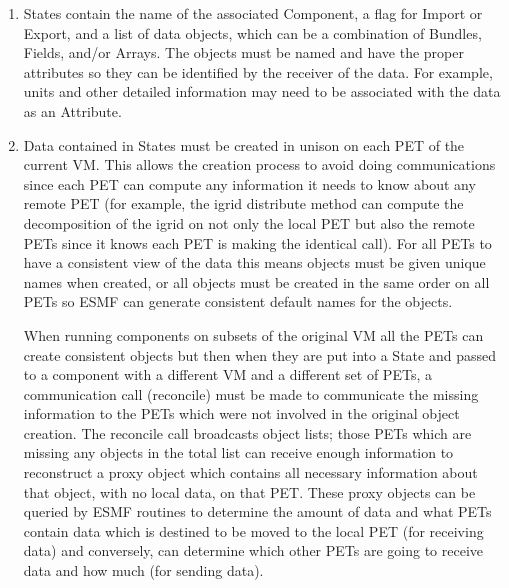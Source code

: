 %


\begin{enumerate}

\item
States contain the name of the associated Component, a flag for Import
or Export, and a list of data objects, which can be a combination of
Bundles, Fields, and/or Arrays.  The objects must be named and have
the proper attributes so they can be identified by the receiver of
the data.  For example, units and other detailed information
may need to be associated with the data as an Attribute.  

\item
Data contained in States must be created in unison on each
PET of the current VM.  This allows the creation process to avoid
doing communications since each PET can compute any information
it needs to know about any remote PET (for example, the igrid
distribute method can compute the decomposition of the igrid on
not only the local PET but also the remote PETs since it knows
each PET is making the identical call).  For all PETs to have a
consistent view of the data this means objects must be given
unique names when created, or all objects must be created in
the same order on all PETs so ESMF can generate consistent
default names for the objects.

When running components on subsets of the original VM all the
PETs can create consistent objects but then when they are put
into a State and passed to a component with a different VM and
a different set of PETs, a communication call (reconcile) must be 
made to communicate the missing information to the PETs which were 
not involved in the original object creation.  The reconcile call
broadcasts object lists; those PETs which are missing any objects
in the total list can receive enough information to
reconstruct a proxy object which contains all necessary information
about that object, with no local data, on that PET.  These proxy
objects can be queried by ESMF routines to determine the amount
of data and what PETs contain data which is destined to be moved
to the local PET (for receiving data) and conversely, can determine
which other PETs are going to receive data and how much (for
sending data).


\end{enumerate}
